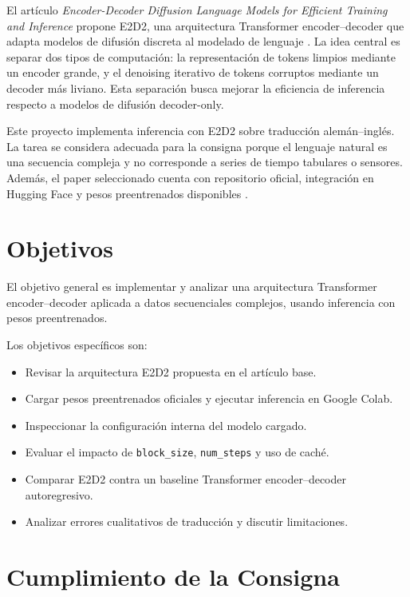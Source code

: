 \documentclass[conference]{IEEEtran}
\begin{document}
El artículo \emph{Encoder-Decoder Diffusion Language Models for Efficient Training and Inference} propone E2D2, una arquitectura Transformer encoder--decoder que adapta modelos de difusión discreta al modelado de lenguaje \cite{arriola2025e2d2}. La idea central es separar dos tipos de computación: la representación de tokens limpios mediante un encoder grande, y el denoising iterativo de tokens corruptos mediante un decoder más liviano. Esta separación busca mejorar la eficiencia de inferencia respecto a modelos de difusión decoder-only.

Este proyecto implementa inferencia con E2D2 sobre traducción alemán--inglés. La tarea se considera adecuada para la consigna porque el lenguaje natural es una secuencia compleja y no corresponde a series de tiempo tabulares o sensores. Además, el paper seleccionado cuenta con repositorio oficial, integración en Hugging Face y pesos preentrenados disponibles \cite{kuleshov_e2d2_repo,hf_e2d2_wmt}.

\section{Objetivos}

El objetivo general es implementar y analizar una arquitectura Transformer encoder--decoder aplicada a datos secuenciales complejos, usando inferencia con pesos preentrenados.

Los objetivos específicos son:

\begin{itemize}
    \item Revisar la arquitectura E2D2 propuesta en el artículo base.
    \item Cargar pesos preentrenados oficiales y ejecutar inferencia en Google Colab.
    \item Inspeccionar la configuración interna del modelo cargado.
    \item Evaluar el impacto de \texttt{block\_size}, \texttt{num\_steps} y uso de caché.
    \item Comparar E2D2 contra un baseline Transformer encoder--decoder autoregresivo.
    \item Analizar errores cualitativos de traducción y discutir limitaciones.
\end{itemize}

\section{Cumplimiento de la Consigna}
\end{document}
